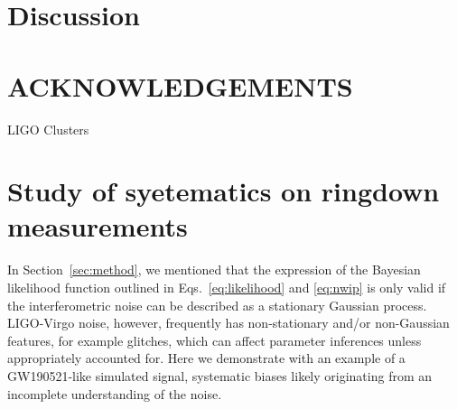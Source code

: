 \documentclass[twocolumn,prd,superscriptaddress,amsfonts,amssymb,amsmath,preprintnumbers]{revtex4-1}
\newcommand{\abhi}[1]{\textcolor{red}{[\textit{AG: #1}]}}
\begin{document}
\section{Discussion}\label{sec:discussion}

\section*{ACKNOWLEDGEMENTS}\label{sec:acknowledgements}
LIGO Clusters

\pagebreak

\appendix
\section{Study of syetematics on ringdown measurements}\label{sec:noise_systematics}

In Section~\ref{sec:method}, we mentioned that the expression of the Bayesian likelihood function outlined in Eqs.~\ref{eq:likelihood} and \ref{eq:nwip} is only valid if the interferometric noise can be described as a stationary Gaussian process. LIGO-Virgo noise, however, frequently has non-stationary and/or non-Gaussian features, for example glitches, which can affect parameter inferences unless appropriately accounted for. Here we demonstrate with an example of a GW190521-like simulated signal, systematic biases likely originating from an incomplete understanding of the noise. 
\end{document}
